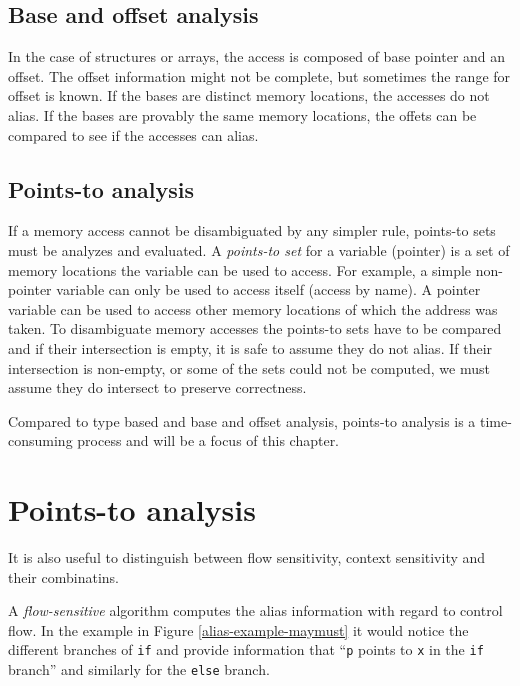 \subsection{Base and offset analysis}
\label{sec-baseoffset}

In the case of structures or arrays, the access is composed of base pointer and
an offset. The offset information might not be complete, but sometimes the range
for offset is known. If the bases are distinct memory locations, the accesses do
not alias.  If the bases are provably the same memory locations, the offets can
be compared to see if the accesses can alias.

\subsection{Points-to analysis}

If a memory access cannot be disambiguated by any simpler rule, points-to sets
must be analyzes and evaluated. A {\it points-to set} for a variable (pointer)
is a set of memory locations the variable can be used to access. For example, a
simple non-pointer variable can only be used to access itself (access by name).
A pointer variable can be used to access other memory locations of which the
address was taken. To disambiguate memory accesses the points-to sets have to be
compared and if their intersection is empty, it is safe to assume they do not
alias. If their intersection is non-empty, or some of the sets could not be
computed, we must assume they do intersect to preserve correctness.

Compared to type based and base and offset analysis, points-to analysis is a
time-consuming process and will be a focus of this chapter.


\section{Points-to analysis}


It is also useful to distinguish between flow sensitivity, context sensitivity
and their combinatins.

A {\it flow-sensitive} algorithm computes the alias information with regard to control
flow. In the example in Figure \ref{alias-example-maymust} it would notice the
different branches of {\tt if} and provide information that ``{\tt p} points to
{\tt x} in the {\tt if} branch'' and similarly for the {\tt else} branch.

